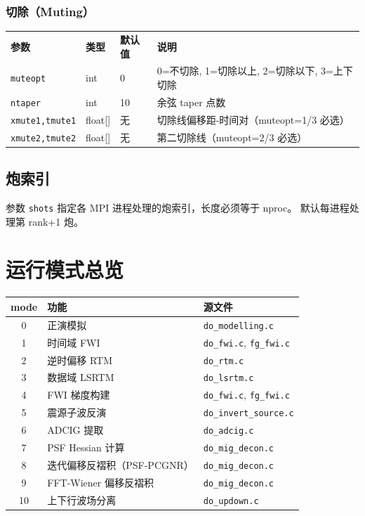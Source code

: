 \documentclass[11pt,a4paper]{ctexart}
\begin{document}
\subsubsection{切除（Muting）}

\begin{tabular}{lllp{5cm}}
\textbf{参数} & \textbf{类型} & \textbf{默认值} & \textbf{说明} \\
\texttt{muteopt} & int & 0 & 0=不切除, 1=切除以上, 2=切除以下, 3=上下切除 \\
\texttt{ntaper}  & int & 10 & 余弦 taper 点数 \\
\texttt{xmute1,tmute1} & float[] & 无 & 切除线偏移距-时间对（muteopt=1/3 必选）\\
\texttt{xmute2,tmute2} & float[] & 无 & 第二切除线（muteopt=2/3 必选）\\
\end{tabular}

\subsection{炮索引}

参数 \texttt{shots} 指定各 MPI 进程处理的炮索引，长度必须等于 nproc。
默认每进程处理第 rank+1 炮。

\section{运行模式总览}

\begin{longtable}{cll}
\toprule
\textbf{mode} & \textbf{功能} & \textbf{源文件} \\
\midrule
\endhead
0  & 正演模拟 & \texttt{do\_modelling.c} \\
1  & 时间域 FWI & \texttt{do\_fwi.c}, \texttt{fg\_fwi.c} \\
2  & 逆时偏移 RTM & \texttt{do\_rtm.c} \\
3  & 数据域 LSRTM & \texttt{do\_lsrtm.c} \\
4  & FWI 梯度构建 & \texttt{do\_fwi.c}, \texttt{fg\_fwi.c} \\
5  & 震源子波反演 & \texttt{do\_invert\_source.c} \\
6  & ADCIG 提取 & \texttt{do\_adcig.c} \\
7  & PSF Hessian 计算 & \texttt{do\_mig\_decon.c} \\
8  & 迭代偏移反褶积（PSF-PCGNR）& \texttt{do\_mig\_decon.c} \\
9  & FFT-Wiener 偏移反褶积 & \texttt{do\_mig\_decon.c} \\
10 & 上下行波场分离 & \texttt{do\_updown.c} \\
\bottomrule
\end{longtable}
\end{document}
